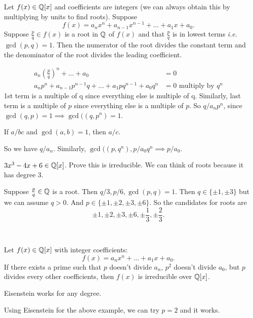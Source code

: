 \documentclass[class=article,crop=false]{standalone}
\begin{document}
\begin{thm}[]
	Let $ f(x) \in \mathbb{Q}[x]$ and coefficients are integers (we can always obtain this by multiplying by units to find roots). Suppose
	\[
		f(x) = a_n x^{n}+ a_{n-1}x^{n-1}+ \ldots+ a_1 x + a_0
	.\] 
	Suppose $ \frac{p}{q} \in f(x)$ is a root in $ \mathbb{Q}$ of $ f(x)$ and that  $ \frac{p}{q}$ is in lowest terms \emph{i.e.} $ \gcd ( p,q)=1 $. Then the numerator of the root divides the constant term and the denominator of the root divides the leading coefficient.
\end{thm}

\begin{prf}
\begin{align*}
	a_n \left( \frac{p}{q} \right) ^{n} + \ldots + a_0 &= 0 \\
	a_n p^{n} + a_{n-1}p^{n-1}q+ \ldots + a_1 p q^{n-1} + a_0 q^{n}&= 0 \text{ multiply by }q^{n}
\end{align*}
1st term is a multiple of q since everything else is multiple of q. Similarly, last term is a multiple of $ p$ since everything else is a multiple of  $ p$. So  $ q / a_n p^{n}$, since $ \gcd ( q,p)=1 \implies \gcd ( (q,p^{n})=1 $. 
\begin{claim}[]
If $ a / bc$ and  $ \gcd ( a,b) =1$, then $ a /c$.
\end{claim}
So we have $ q / a_n$. Similarly, $ \gcd ( (p,q^{n}), p / a_0 q^{n} \implies p / a_0$.
\end{prf}

\begin{eg}[]
	$ 3x^{3}-4x+6 \in \mathbb{Q}[x]$. Prove this is irreducible. We can think of roots because it has degree 3.

	Suppose $ \frac{p}{q} \in \mathbb{Q}$ is a root. Then $ q /3, p /6, \gcd ( p,q)=1 $. Then $ q \in \{\pm 1,\pm 3 \} $ but we can assume $ q>0$. And  $ p \in \{\pm 1,\pm 2,\pm 3,\pm 6\} $. So the candidates for roots are
	\[
	\pm 1, \pm 2, \pm 3, \pm 6, \pm \frac{1}{3}, \pm \frac{2}{3}
	.\] 
\end{eg}

~\begin{thm}
	Let $ f(x) \in \mathbb{Q}[x]$ with integer coefficients:
	\[
		f(x) = a_n x^{n}+ \ldots + a_1 x + a_0
	.\] 
	If there exists a prime such that $ p $ doesn't divide  $ a_n$, $ p^2$ doesn't divide $ a_0$, but $ p$ divides every other coefficients, then  $ f(x) $ is irreducible over  $ \mathbb{Q}[x]$. 
\end{thm}
\begin{note}[]
Eisenstein works for any degree.
\end{note}
\begin{eg}[]
Using Eisenstein for the above example, we can try $ p=2$ and it works.
\end{eg}
\end{document}
